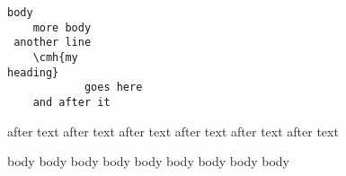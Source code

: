 \begin{verbatim}
body
    more body
 another line
    \cmh{my 
heading}
            goes here
    and after it
    \end{verbatim}

    after text after text 
    after text after text 
    after text after text 
    \begin{not}
      body body body
      body body body
      body body body
    \end{not}

